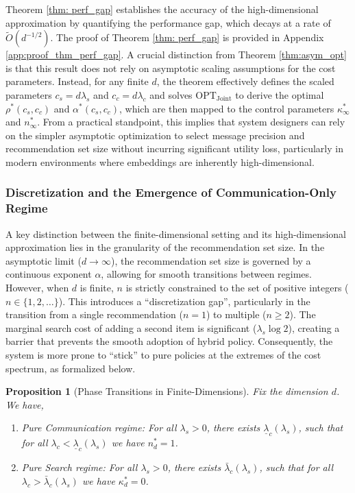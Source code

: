 \documentclass[12pt]{article}
\newtheorem{proposition}[theorem]{Proposition}
\theoremstyle{definition}
\theoremstyle{remark}
\begin{document}
Theorem \ref{thm: perf_gap} establishes the accuracy of the high-dimensional approximation by quantifying the performance gap, which decays at a rate of $\tilde{O}(d^{-1/2})$. The proof of Theorem \ref{thm: perf_gap} is provided in Appendix \ref{app:proof_thm_perf_gap}. A crucial distinction from Theorem \ref{thm:asym_opt} is that this result does not rely on asymptotic scaling assumptions for the cost parameters. Instead, for any finite $d$, the theorem effectively defines the scaled parameters $c_s = d\lambda_s$ and $c_c = d\lambda_c$ and solves $\mathrm{OPT}_{\mathrm{Joint}}$ to derive the optimal $\rho^*(c_s,c_c)$ and $\alpha^*(c_s,c_c)$, which are then mapped to the control parameters $\kappa^*_\infty$ and $n^*_\infty$. From a practical standpoint, this implies that system designers can rely on the simpler asymptotic optimization to select message precision and recommendation set size without incurring significant utility loss, particularly in modern environments where embeddings are inherently high-dimensional.

\subsubsection{Discretization and the Emergence of Communication-Only Regime}
\label{sec:finite_d_regimes}
A key distinction between the finite-dimensional setting and its high-dimensional approximation lies in the granularity of the recommendation set size. In the asymptotic limit ($d \to \infty$), the recommendation set size is governed by a continuous exponent $\alpha$, allowing for smooth transitions between regimes. However, when $d$ is finite, $n$ is strictly constrained to the set of positive integers ($n \in \{1, 2, \dots\}$). This introduces a ``discretization gap'', particularly in the transition from a single recommendation ($n=1$) to multiple ($n \ge 2$). The marginal search cost of adding a second item is significant ($\lambda_s \log 2$), creating a barrier that prevents the smooth adoption of hybrid policy. Consequently, the system is more prone to ``stick'' to pure policies at the extremes of the cost spectrum, as formalized below.

\begin{proposition}[Phase Transitions in Finite-Dimensions]
\label{prop:finite_phase_transition}
    Fix the dimension $d$. We have,
    \begin{enumerate}
        \item \emph{Pure Communication regime:} For all $\lambda_s > 0$, there exists $\underline \lambda_c(\lambda_s)$, such that for all $\lambda_c < \underline \lambda_c(\lambda_s)$ we have  $n^*_d = 1$.
        \item \emph{Pure Search regime:} For all  $\lambda_s > 0$, there exists $\bar \lambda_c(\lambda_s)$, such that for all $\lambda_c > \bar{\lambda}_c(\lambda_s)$ we have $\kappa^*_d = 0$.
    \end{enumerate}
\end{proposition}
\end{document}
